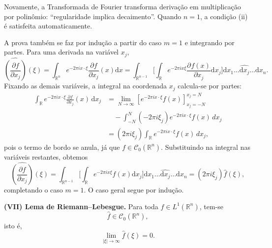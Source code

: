 \documentclass[../distribution_theory_notes.tex]{subfiles}
\begin{document}
\begin{tcolorbox}[
		skin=enhanced,
		title=Observação,
		fonttitle=\bfseries,
		colframe=black,
		colbacktitle=cyan!75!white,
		colback=cyan!15,
		colbacklower=black,
		coltitle=black,
		drop fuzzy shadow,
	]
	Novamente, a Transformada de Fourier transforma derivação em multiplicação por polinômio: ``regularidade implica decaimento''. Quando $n=1$, a condição (ii) é satisfeita automaticamente.
\end{tcolorbox}

\begin{proof*}
	A prova também se faz por indução a partir do caso $m=1$ e integrando por partes. Para uma derivada na variável $x_{j}$,
	\[
		\widehat{\left(\frac{\partial f}{\partial x_{j}}\right)}(\xi)
		=\int_{\mathbb{R}^{n}}e^{-2\pi i x\cdot\xi}\frac{\partial f}{\partial x_{j}}(x)\mathrm{d}x = \int_{\mathbb{R}^{n-1}}^{}\biggl[\int_{\mathbb{R}}^{}e^{-2\pi ix \xi }\frac{\partial^{}f(x)}{\partial x_{j}^{}} \mathrm{d}x_{j}\biggr] \mathrm{d}x_1 \dotsc \widehat{\mathrm{d}x_{j}}\dotsc \mathrm{d}x_{n}.
	\]
	Fixando as demais variáveis, a integral na coordenada $x_{j}$ calcula-se por partes:
	\begin{align*}
		\int_{\mathbb{R}}e^{-2\pi i x\cdot\xi}
		\frac{\partial f}{\partial x_{j}}(x)\,\mathrm{d}x_{j}
		 & =\lim_{N\to\infty}
		\left[
			e^{-2\pi i x\cdot\xi}f(x)
		\right]_{x_{j}=-N}^{x_{j}=N}                      \\
		 & \quad-\int_{-N}^{N}
		(-2\pi i\xi_{j})e^{-2\pi i x\cdot\xi}f(x)\,dx_{j} \\
		 & =(2\pi i\xi_{j})
		\int_{\mathbb{R}}e^{-2\pi i x\cdot\xi}f(x)\,dx_{j},
	\end{align*}
	pois o termo de bordo se anula, já que $f\in\mathcal{C}_{0}(\mathbb{R}^{n})$. Substituindo na integral nas variáveis restantes, obtemos
	\[
		\widehat{\left(\frac{\partial f}{\partial x_{j}}\right)}(\xi) = \int_{\mathbb{R}^{n-1}}^{}\biggl[\int_{\mathbb{R}}^{}e^{-2\pi ix \xi }f(x) \mathrm{d}x_{j}\biggr] \mathrm{d}x_1 \dotsc \widehat{\mathrm{d}x_{j}}\dotsc \mathrm{d}x_{n}
		=(2\pi i\xi_{j})\widehat f(\xi),
	\]
	completando o caso $m=1$. O caso geral segue por indução. \qedsymbol
\end{proof*}

\medskip
\noindent\textbf{(VII) Lema de Riemann--Lebesgue.} Para toda $f\in L^{1}(\mathbb{R}^{n})$, tem-se
\[
	\widehat f\in\mathcal{C}_{0}(\mathbb{R}^{n}),
\]
isto é,
\[
	\lim_{|\xi|\to\infty}\widehat f(\xi)=0.
\]
\end{document}
